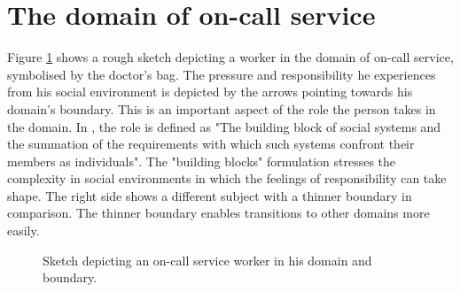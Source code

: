 \documentclass{CML_Seminar_Template}
\begin{document}
\section{The domain of on-call service}
Figure \ref{Boundary_sketch_fig} shows a rough sketch depicting a worker in the domain of on-call service, symbolised by the doctor's bag. The pressure and responsibility he experiences from his social environment is depicted by the arrows pointing towards his domain's boundary. This is an important aspect of the role the person takes in the domain. In \cite[]{katz1978social}, the role is defined as "The building block of social systems and the summation of the requirements with which such systems confront their members as individuals". The "building blocks" formulation stresses the complexity in social environments in which the feelings of responsibility can take shape. 
The right side shows a different subject with a thinner boundary in comparison. The thinner boundary enables transitions to other domains more easily.
\begin{figure}[htb]
  \begin{center}
  \end{center}
    \caption{\label{Boundary_sketch_fig}  Sketch depicting an on-call service worker in his domain and boundary. }
\end{figure}
\end{document}
